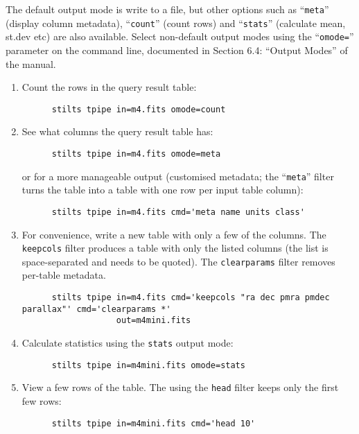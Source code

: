 \documentclass{article}
\begin{document}
The default output mode is write to a file,
but other options such as ``{\tt meta}'' (display column metadata),
``{\tt count}'' (count rows) and ``{\tt stats}'' (calculate mean, st.dev etc)
are also available.
Select non-default output modes using the ``{\tt omode=}'' parameter
on the command line, documented in Section 6.4: ``Output Modes'' of the manual.

\begin{enumerate}
\item Count the rows in the query result table:
      \preverb
      \begin{verbatim}
      stilts tpipe in=m4.fits omode=count
      \end{verbatim}
      \postverb
\item See what columns the query result table has:
      \preverb
      \begin{verbatim}
      stilts tpipe in=m4.fits omode=meta
      \end{verbatim}
      \postverb
      or for a more manageable output
      (customised metadata; the ``{\tt meta}'' filter turns the table
      into a table with one row per input table column):
      \preverb
      \begin{verbatim}
      stilts tpipe in=m4.fits cmd='meta name units class'
      \end{verbatim}
      \postverb
\item For convenience, write a new table with only a few of the columns.
      The {\tt keepcols} filter produces a table with only the listed
      columns (the list is space-separated and needs to be quoted).
      The {\tt clearparams} filter removes per-table metadata.
      \preverb
      \begin{verbatim}
      stilts tpipe in=m4.fits cmd='keepcols "ra dec pmra pmdec parallax"' cmd='clearparams *'
                   out=m4mini.fits
      \end{verbatim}
      \postverb
\item Calculate statistics using the {\tt stats} output mode:
      \preverb
      \begin{verbatim}
      stilts tpipe in=m4mini.fits omode=stats
      \end{verbatim}
      \postverb
\item View a few rows of the table.
      The using the {\tt head} filter keeps only the first few rows:
      \preverb
      \begin{verbatim}
      stilts tpipe in=m4mini.fits cmd='head 10'
      \end{verbatim}

\end{enumerate}
\end{document}
